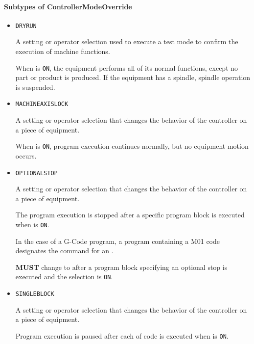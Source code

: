 \paragraph{Subtypes of ControllerModeOverride}\mbox{}
\label{sec:Subtypes of ControllerModeOverride}

\begin{itemize}

\item \texttt{DRY\textunderscore RUN}


A setting or operator selection used to execute a test mode to confirm the execution of machine functions. 

When  is \texttt{ON}, the equipment performs all of its normal functions, except no part or product is produced.  If the equipment has a spindle, spindle operation is suspended.

\item \texttt{MACHINE\textunderscore AXIS\textunderscore LOCK}


A setting or operator selection that changes the behavior of the controller on a piece of equipment. 
 
When  is \texttt{ON}, program execution continues normally, but no equipment motion occurs.

\item \texttt{OPTIONAL\textunderscore STOP}


A setting or operator selection that changes the behavior of the controller on a piece of equipment. 

The program execution is stopped after a specific program block is executed when  is \texttt{ON}.    

In the case of a G-Code program, a program  containing a M01 code designates the command for an . 

 \textbf{MUST} change to  after a program block specifying an optional stop is executed and the  selection is \texttt{ON}.

\item \texttt{SINGLE\textunderscore BLOCK}


A setting or operator selection that changes the behavior of the controller on a piece of equipment. 

Program execution is paused after each  of code is executed when  is \texttt{ON}.   


\end{itemize}
